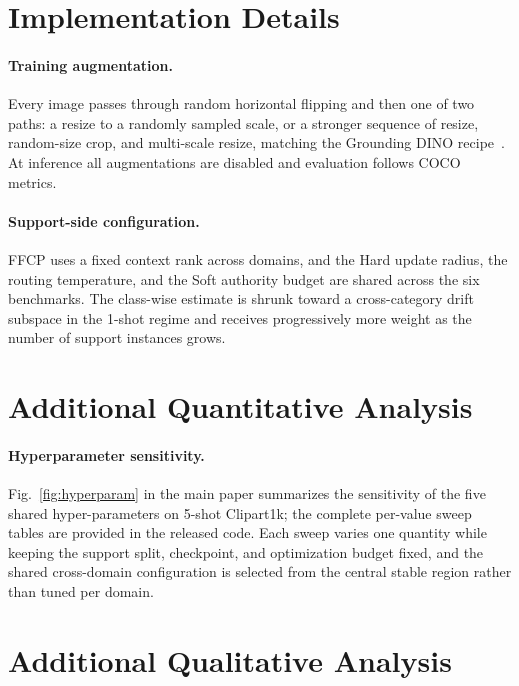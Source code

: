 \clearpage
\setcounter{page}{1}
\maketitlesupplementary

\section{Implementation Details}
\label{sec:suppl_impl}

\paragraph{Training augmentation.}
Every image passes through random horizontal flipping and then one of two
paths: a resize to a randomly sampled scale, or a stronger sequence of
resize, random-size crop, and multi-scale resize, matching the
Grounding DINO recipe~\cite{groundingdino}. At inference all augmentations are
disabled and evaluation follows COCO metrics.

\paragraph{Support-side configuration.}
FFCP uses a fixed context rank across domains, and the Hard update radius, the
routing temperature, and the Soft authority budget are shared across the six
benchmarks. The class-wise estimate is shrunk toward a cross-category drift
subspace in the 1-shot regime and receives progressively more weight as the
number of support instances grows.

\section{Additional Quantitative Analysis}
\label{sec:suppl_extra}

\paragraph{Hyperparameter sensitivity.}
Fig.~\ref{fig:hyperparam} in the main paper summarizes the sensitivity of the
five shared hyper-parameters on 5-shot Clipart1k; the complete per-value sweep
tables are provided in the released code. Each sweep varies one quantity while
keeping the support split, checkpoint, and optimization budget fixed, and the
shared cross-domain configuration is selected from the central stable region
rather than tuned per domain.

\section{Additional Qualitative Analysis}
\label{sec:suppl_qual}


